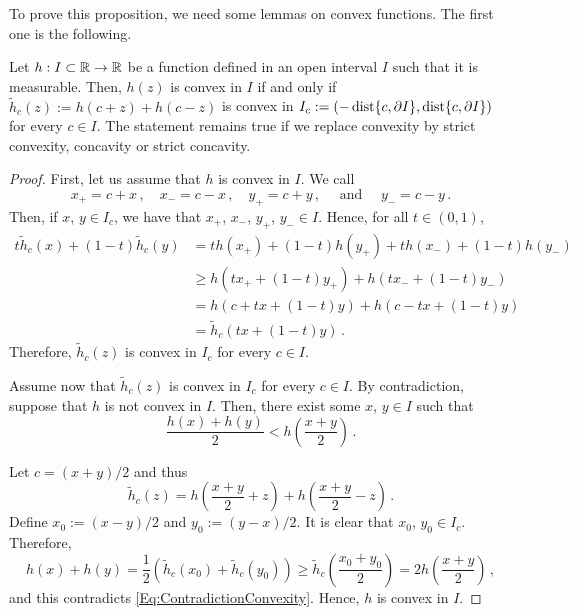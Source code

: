 To prove this proposition, we need some lemmas on convex functions. The first one is the following.

\begin{lemma}
\label{Lemma:Convex<->AllReflectionsConvex} Let $h: I \subset \mathbb{R} \to \mathbb{R}$ be a function defined in
an open interval $I$ such that it is measurable. Then, $h(z)$ is convex in $I$ if and only if
$\widetilde{h}_c(z) := h(c+z) + h(c-z)$ is convex in $I_c := (-\operatorname{dist}\{c, \partial I\}, \operatorname{dist}\{c,
\partial I\})$ for every $c\in I$. The statement remains true if we replace convexity by strict
convexity, concavity or strict concavity.
\end{lemma}

\begin{proof}
First, let us assume that $h$ is convex in $I$. We call
$$
x_+ = c + x\,, \quad x_- = c - x\,, \quad y_+ = c + y\,, \quad \textrm{ and } \quad y_- = c - y\,.
$$
Then, if $x$, $y\in I_c$, we have that $x_+$, $x_-$, $y_+$, $y_- \in I$. Hence, for all $t\in(0,1)$,
\begin{align*}
t\widetilde{h}_c(x) + (1-t)\widetilde{h}_c(y)
&=  th(x_+) + (1-t)h(y_+) + t h(x_-) + (1-t)h(y_-) \\
&\geq h(tx_+ + (1-t)y_+) + h(tx_- + (1-t)y_-) \\
&= h(c + tx + (1-t)y) + h(c-tx + (1-t)y) \\
& = \widetilde{h}_c(tx + (1-t)y)\,.
\end{align*}
Therefore, $\widetilde{h}_c(z)$ is convex in $I_c$ for every $c\in I$.

Assume now that $\widetilde{h}_c(z)$ is convex in $I_c$ for every $c\in I$. By contradiction,
suppose that $h$ is not convex in $I$. Then, there exist some $x$, $y\in I$ such that
\begin{equation}
\label{Eq:ContradictionConvexity}
\dfrac{h(x) + h(y)}{2} < h \left (\dfrac{x+y}{2}\right )\,.
\end{equation}

Let $c = (x+y)/2$ and thus
$$
\widetilde{h}_c(z) = h\left( \dfrac{x+y}{2} + z\right) +  h\left( \dfrac{x+y}{2} - z\right)\,.
$$
Define $ x_0 := (x-y)/2$ and $y_0:= (y-x)/2$. It is clear that $x_0$, $y_0\in I_c$. Therefore,
$$
h(x) + h(y) = \dfrac{1}{2} \left( \widetilde{h}_c(x_0) + \widetilde{h}_c(y_0)\right )
\geq \widetilde{h}_c \left( \dfrac{x_0 + y_0}{2}\right )
= 2 h \left (\dfrac{x+y}{2}\right )\,,
$$
and this contradicts \eqref{Eq:ContradictionConvexity}. Hence, $h$ is convex in $I$.
\end{proof}


